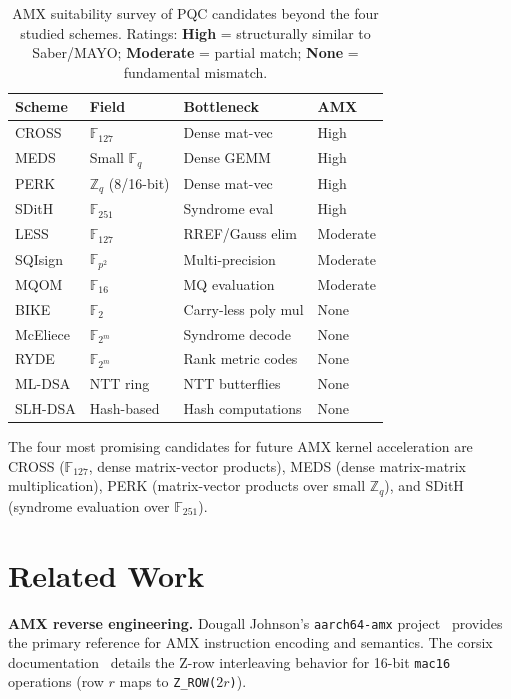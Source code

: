 \documentclass[utf8]{FrontiersinHarvard}
\begin{document}
\begin{table}[htbp]
\centering
\caption{AMX suitability survey of PQC candidates beyond the four studied schemes. Ratings: \textbf{High} = structurally similar to Saber/MAYO; \textbf{Moderate} = partial match; \textbf{None} = fundamental mismatch.}
\label{tab:survey}
\small
\begin{tabular}{l l l l}
\hline
\textbf{Scheme} & \textbf{Field} & \textbf{Bottleneck} & \textbf{AMX} \\
\hline
CROSS    & $\mathbb{F}_{127}$    & Dense mat-vec         & High \\
MEDS     & Small $\mathbb{F}_q$  & Dense GEMM            & High \\
PERK     & $\mathbb{Z}_q$ (8/16-bit) & Dense mat-vec     & High \\
SDitH    & $\mathbb{F}_{251}$    & Syndrome eval         & High \\
LESS     & $\mathbb{F}_{127}$    & RREF/Gauss elim       & Moderate \\
SQIsign  & $\mathbb{F}_{p^2}$    & Multi-precision       & Moderate \\
MQOM     & $\mathbb{F}_{16}$     & MQ evaluation         & Moderate \\
BIKE     & $\mathbb{F}_2$        & Carry-less poly mul   & None \\
McEliece & $\mathbb{F}_{2^m}$    & Syndrome decode       & None \\
RYDE     & $\mathbb{F}_{2^m}$    & Rank metric codes     & None \\
ML-DSA   & NTT ring              & NTT butterflies       & None \\
SLH-DSA  & Hash-based            & Hash computations     & None \\
\hline
\end{tabular}
\end{table}

The four most promising candidates for future AMX kernel acceleration are CROSS ($\mathbb{F}_{127}$, dense matrix-vector products), MEDS (dense matrix-matrix multiplication), PERK (matrix-vector products over small $\mathbb{Z}_q$), and SDitH (syndrome evaluation over $\mathbb{F}_{251}$).


\section{Related Work}
\label{sec:related}

\textbf{AMX reverse engineering.} Dougall Johnson's \texttt{aarch64-amx} project~\cite{dougallj2022amx} provides the primary reference for AMX instruction encoding and semantics. The corsix documentation~\cite{corsix2022amx} details the Z-row interleaving behavior for 16-bit \texttt{mac16} operations (row $r$ maps to \texttt{Z\_ROW($2r$)}).
\end{document}
